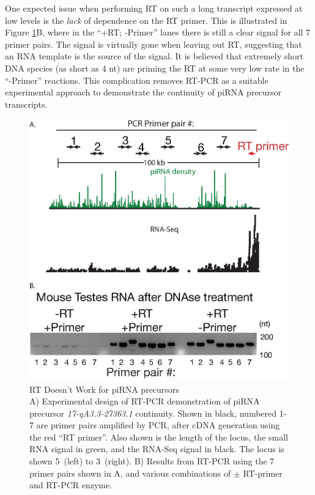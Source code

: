     One expected issue when performing RT on such a long transcript expressed at low levels is the \textit{lack} of dependence on the RT primer. This is illustrated in Figure \ref{SeqZipMethod:fig:RT doesn't work for precursors}B, where in the ``+RT; -Primer'' lanes there is still a clear signal for all 7 primer pairs. The signal is virtually gone when leaving out RT, suggesting that an RNA template is the source of the signal. It is believed that extremely short DNA species (as short as 4 nt) are priming the RT at some very low rate in the ``-Primer'' reactions. This complication removes RT-PCR as a suitable experimental approach to demonstrate the continuity of piRNA precursor transcripts.

    \begin{figure} %
      \centering 
      \includegraphics{Figures/SeqZipMethod/RTDoesntWork.eps}
      \caption[pRT Doesn't Work for piRNA precursors]
      {
        RT Doesn't Work for piRNA precursors\\[0.25cm]
        A) Experimental design of RT-PCR demonstration of piRNA precursor \textit{17-qA3.3-27363.1} continuity. Shown in black, numbered 1-7 are primer pairs amplified by PCR, after cDNA generation using the red ``RT primer''. Also shown is the length of the locus, the small RNA signal in green, and the RNA-Seq signal in black. The locus is shown 5\textprime~(left) to 3\textprime~(right). B) Results from RT-PCR using the 7 primer pairs shown in A, and various combinations of $\pm$ RT-primer and RT-PCR enzyme.
      	}
      \label{SeqZipMethod:fig:RT doesn't work for precursors}
    	\end{figure}

